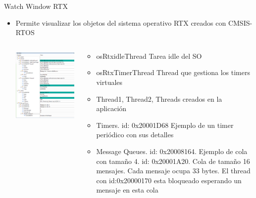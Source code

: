 \begin{frame}{Watch Window RTX}
    \begin{itemize}
        \item Permite visualizar los objetos del sistema operativo RTX creados con CMSIS-RTOS
        \begin{columns}
            \begin{column}{0.50\textwidth}
            \includegraphics[scale=0.5]{presentation/watchwindowRTX.png}
                
            \end{column}
            \begin{column}{0.50\textwidth}
            \begin{itemize}
                \item osRtxidleThread Tarea idle del SO
                \item osRtxTimerThread Thread que gestiona los timers virtuales
                \item Thread1, Thread2, Threads creados en la aplicación
                \item Timers. id: 0x20001D68 Ejemplo de un timer periódico con sus detalles
                \item Message Queues. id: 0x20008164. Ejemplo de cola con tamaño 4. id: 0x20001A20. Cola de tamaño 16 mensajes. Cada mensaje ocupa 33 bytes. El thread con id:0x20000170 esta bloqueado esperando un mensaje en esta cola
                
            \end{itemize}
            \end{column}
        \end{columns}
    \end{itemize}
\end{frame}


